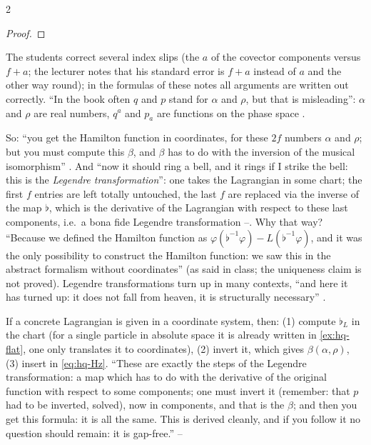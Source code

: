 \begin{paracol}{2}
\begin{proof}
\end{proof}
\begin{coursenote}\label{cn:hq-slips}
The students correct several index slips (the $a$ of the covector components versus $f+a$; the lecturer notes that his standard error is $f+a$ instead of $a$ and the other way round); in the formulas of these notes all arguments are written out correctly. ``In the book often $q$ and $p$ stand for $\alpha$ and $\rho$, but that is misleading'': $\alpha$ and $\rho$ are real numbers, $q^a$ and $p_a$ are functions on the phase space .
\end{coursenote}

So: ``you get the Hamilton function in coordinates, for these $2f$ numbers $\alpha$ and $\rho$; but you must compute this $\beta$, and $\beta$ has to do with the inversion of the musical isomorphism'' . And ``now it should ring a bell, and it rings if I strike the bell: this is the \emph{Legendre transformation}'': one takes the Lagrangian in some chart; the first $f$ entries are left totally untouched, the last $f$ are replaced via the inverse of the map $\flat$, which is the derivative of the Lagrangian with respect to these last components, i.e.\ a bona fide Legendre transformation --. Why that way? ``Because we defined the Hamilton function as $\varphi(\flat^{-1}\varphi)-L(\flat^{-1}\varphi)$, and it was the only possibility to construct the Hamilton function: we saw this in the abstract formalism without coordinates'' (as said in class; the uniqueness claim is not proved). Legendre transformations turn up in many contexts, ``and here it has turned up: it does not fall from heaven, it is structurally necessary'' .

\begin{coursenote}\label{cn:hq-practice}
If a concrete Lagrangian is given in a coordinate system, then: (1) compute $\flat_L$ in the chart (for a single particle in absolute space it is already written in \cref{ex:hq-flat}, one only translates it to coordinates), (2) invert it, which gives $\beta(\alpha,\rho)$, (3) insert in \eqref{eq:hq-Hz}. ``These are exactly the steps of the Legendre transformation: a map which has to do with the derivative of the original function with respect to some components; one must invert it (remember: that $p$ had to be inverted, solved), now in components, and that is the $\beta$; and then you get this formula: it is all the same. This is derived cleanly, and if you follow it no question should remain: it is gap-free.'' --
\end{coursenote}


\end{paracol}
